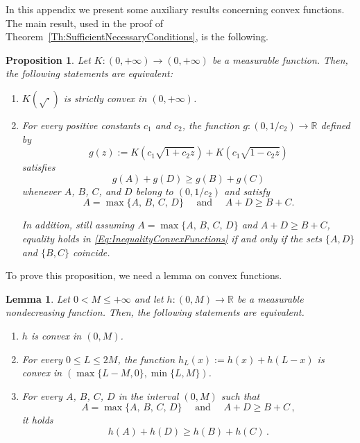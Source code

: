 \documentclass[12pt,reqno]{amsart}
\newtheorem{proposition}[theorem]{Proposition}
\newtheorem{lemma}[theorem]{Lemma}
\theoremstyle{definition}
\theoremstyle{remark}
\newcommand{\con}[1]{\mathbb{#1}}
\newcommand{\R}{\con{R}} %
\numberwithin{equation}{section}
\begin{document}
	In this appendix we present some auxiliary results concerning convex functions. The main result, used in the proof of Theorem~\ref{Th:SufficientNecessaryConditions}, is the following.
	
	\begin{proposition}
		\label{Prop:EquivalenceK(sqrt)Convex<->Inequality}
		Let $K:(0, +\infty) \to (0,+\infty)$ be a measurable function. Then, the following statements are equivalent:
		\begin{enumerate}
			\item[i)] $K(\sqrt{\cdot})$ is strictly convex in $(0, +\infty)$.
			\item[ii)] For every positive constants $c_1$ and $c_2$, the function $g:(0,1/c_2)\to \R$ defined by
			\begin{equation}
			\label{Eq:DefinitiongFromK}
			g(z) := K(c_1 \sqrt{1 + c_2z}) + K(c_1 \sqrt{1 - c_2z})
			\end{equation}
			satisfies 
			\begin{equation}
			\label{Eq:InequalityConvexFunctions}
			g(A) + g(D) \geq g(B) + g(C)
			\end{equation}
			whenever $A$, $B$, $C$, and $D$ belong to $(0, 1/c_2)$ and satisfy
			$$
			A = \max\{A,\, B,\, C,\, D\} \quad \text{ and } \quad A + D \geq B + C.
			$$
			
			In addition, still assuming $A = \max\{A,\, B,\, C,\, D\}$ and $A + D \geq B + C$, equality holds in \eqref{Eq:InequalityConvexFunctions} if and only if the sets $\{A,D\}$ and $\{B,C\}$ coincide.	
		\end{enumerate}
	\end{proposition}
	
	
	
	To prove this proposition, we need a lemma on convex functions. 
	
	
	\begin{lemma}
		\label{Lemma:ConvexFunctions}
		Let $0<M\leq +\infty$ and let $h:(0,M)\to \R$ be a measurable nondecreasing function. Then, the following statements are equivalent.
		
		\begin{enumerate}[label=(\alph*)]
			\item $h$ is convex in $(0,M)$.
			
			\item For every $0\leq L\leq 2M$, the function $h_L (x) := h(x) + h(L-x)$ is convex in $(\max \{L-M,0\}, \min \{L,M\})$.
			
			\item For every $A$, $B$, $C$, $D$ in the interval $(0,M)$ such that
			$$
			A = \max\{A,\, B,\, C,\, D\} \quad \text{ and } \quad A + D \geq B + C\,,
			$$
			it holds
			\begin{equation}
			\label{Eq:InequalityConvexFunctionsbis}
			h(A) + h(D) \geq h(B) + h(C)\,.
			\end{equation}
		\end{enumerate}
	\end{lemma}
	
\end{document}
